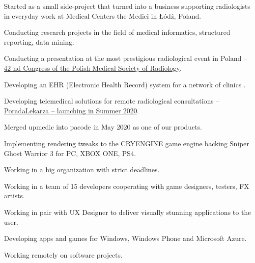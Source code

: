 \documentclass[]{deedy-resume-reversed}
\begin{document}
\begin{minipage}[t]{0.60\textwidth}
\begin{tightemize}
\item Started as a small side-project that turned into a business supporting radiologists in everyday work at Medical Centers the Medici in Łódź, Poland.
\item Conducting research projects in the field of medical informatics, structured reporting, data mining.
\item Conducting a presentation at the most prestigious radiological event in Poland -- \href{https://upmedic.pl/static/homepage/images/products/Streszczenia_42_Zjazd_PLTR.pdf}{42 nd Congress of the Polish Medical Society of Radiology}.
\item Developing an EHR (Electronic Health Record) system for a network of clinics .
\item Developing telemedical solutions for remote radiological consultations -- \href{https://poradalekarza.pl}{PoradaLekarza -- launching in Summer 2020}.
\item Merged upmedic into pacode in May 2020 as one of our products.

\end{tightemize}
\sectionsep

\begin{tightemize}
\item Implementing rendering tweaks to the CRYENGINE game engine backing Sniper Ghost Warrior 3 for PC, XBOX ONE, PS4.
\item Working in a big organization with strict deadlines.
\item Working in a team of 15 developers cooperating with game designers, testers, FX artists.
\end{tightemize}
\sectionsep

\begin{tightemize}
\item Working in pair with UX Designer to deliver visually stunning applications to the user.
\item Developing apps and games for Windows, Windows Phone and Microsoft Azure.
\item Working remotely on software projects.
\end{tightemize}
\sectionsep



\end{minipage}
\end{document}
